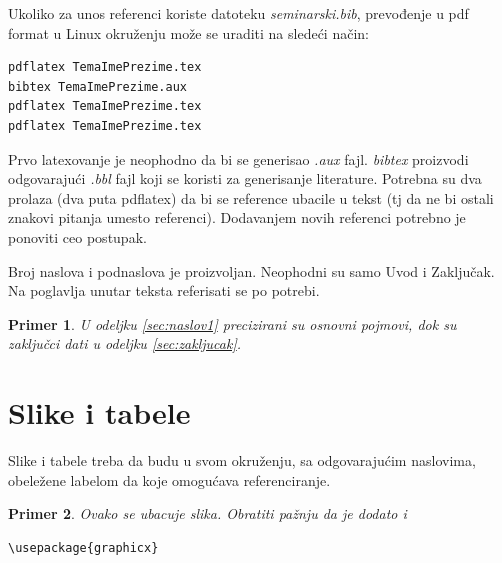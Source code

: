 \documentclass[a4paper]{article}
\newtheorem{primer}{Primer}[subsection]
\begin{document}
{Ukoliko za unos referenci koriste datoteku {\em seminarski.bib},  prevođenje u pdf format u Linux okruženju može se uraditi na sledeći način:
\begin{verbatim}
pdflatex TemaImePrezime.tex 
bibtex TemaImePrezime.aux 
pdflatex TemaImePrezime.tex 
pdflatex TemaImePrezime.tex 
\end{verbatim}
Prvo latexovanje je neophodno da bi se generisao {\em .aux} fajl. {\em bibtex} proizvodi odgovarajući {\em .bbl} fajl koji se koristi za generisanje literature. 
Potrebna su dva prolaza (dva puta pdflatex) da bi se reference ubacile u tekst (tj da ne bi ostali znakovi pitanja umesto referenci). Dodavanjem novih referenci potrebno je ponoviti ceo postupak.  


Broj naslova i podnaslova je proizvoljan. Neophodni su samo Uvod i Zaključak. Na poglavlja unutar teksta referisati se po potrebi. 
\begin{primer}
U odeljku \ref{sec:naslov1} precizirani su osnovni pojmovi, dok su zaključci dati u odeljku \ref{sec:zakljucak}.
\end{primer}




\section{Slike i tabele}
\label{slike_i_tabele}

Slike i tabele treba da budu u svom okruženju, sa odgovarajućim naslovima, obeležene labelom da koje omogućava referenciranje. 

\begin{primer} Ovako se ubacuje slika. Obratiti pažnju da je dodato i 
\begin{verbatim}
\usepackage{graphicx}
\end{verbatim}


\end{primer}}
\end{document}
